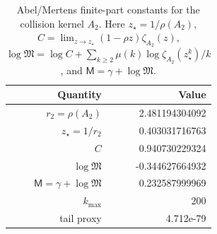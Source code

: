 \begin{table}[H]
\centering
\scriptsize
\setlength{\tabcolsep}{6pt}
\caption{Abel/Mertens finite-part constants for the collision kernel $A_2$. Here $z_\star=1/\rho(A_2)$, $C=\lim_{z\to z_\star}(1-\rho z)\zeta_{A_2}(z)$, $\log\mathfrak{M}=\log C+\sum_{k\ge2}\mu(k)\log\zeta_{A_2}(z_\star^k)/k$, and $\mathsf{M}=\gamma+\log\mathfrak{M}$.}
\label{tab:collision_kernel_A2_finite_part}
\begin{tabular}{r r}
\toprule
Quantity & Value\\
\midrule
$r_2=\rho(A_2)$ & 2.481194304092\\
$z_\star=1/r_2$ & 0.403031716763\\
$C$ & 0.940730229324\\
$\log\mathfrak{M}$ & -0.344627664932\\
$\mathsf{M}=\gamma+\log\mathfrak{M}$ & 0.232587999969\\
$k_{\max}$ & 200\\
tail proxy & 4.712e-79\\
\bottomrule
\end{tabular}
\end{table}
